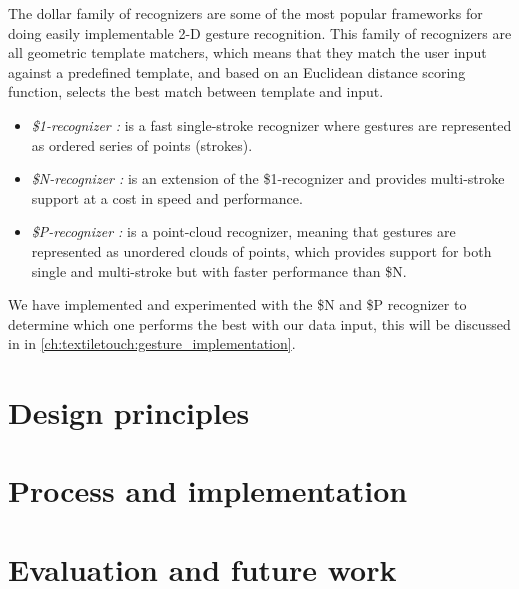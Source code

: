The dollar family of recognizers \citep{anthony2010lightweight,vatavu2012gestures,wobbrock2007gestures} are some of the most popular frameworks for doing easily implementable 2-D gesture recognition.
This family of recognizers are all geometric template matchers, which means that they match the user input against a predefined template, and based on an Euclidean distance scoring function, selects the best match between template and input.
\begin{itemize}
  \item \emph{\$1-recognizer \citep{wobbrock2007gestures}:} is a fast single-stroke recognizer where gestures are represented as ordered series of points (strokes).
  \item \emph{\$N-recognizer \citep{anthony2010lightweight}:} is an extension of the \$1-recognizer and provides multi-stroke support at a cost in speed and performance.
  \item \emph{\$P-recognizer \citep{vatavu2012gestures}:} is a point-cloud recognizer, meaning that gestures are represented as unordered clouds of points, which provides support for both single and multi-stroke but with faster performance than \$N. 
\end{itemize}
We have implemented and experimented with the \$N and \$P recognizer to determine which one performs the best with our data input, this will be discussed in  in \ref{ch:textiletouch:gesture_implementation}.

\section{Design principles}


\section{Process and implementation}


\section{Evaluation and future work}
